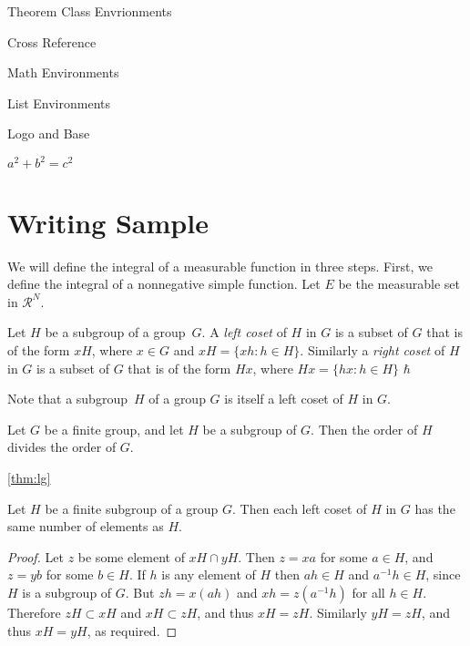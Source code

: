 \documentclass[11pt,fancy,twocol,twoside]{elegantbook}
\begin{document}
\begin{introduction}
\item Theorem Class Envrionments
\item Cross Reference
\item Math Environments
\item List Environments
\item Logo and Base 
\item $a^2+b^2=c^2$
\end{introduction}


\lipsum[1]

\section{Writing Sample}

We will define the integral of a measurable function in three steps. First, we define the integral of a nonnegative simple function. Let $E$ be the measurable set in $\mathcal{R}^N$.

\begin{definition}
Let $H$ be a subgroup of a group~$G$.  A \emph{left coset} of $H$ in $G$ is a subset of $G$ that is of the form $xH$, where $x \in G$ and $xH = \{ xh : h \in H \}$. Similarly a \emph{right coset} of $H$ in $G$ is a subset of $G$ that is of the form $Hx$, where $Hx = \{ hx : h \in H \}$ $\hbar$
\end{definition}

\begin{note}
Note that a subgroup~$H$ of a group $G$ is itself a left coset of $H$ in $G$.
\end{note}

\lipsum[2]

\begin{theorem} \label{thm:lg}
Let $G$ be a finite group, and let $H$ be a subgroup of $G$.  Then the order of $H$ divides the order of $G$.
\end{theorem}

\ref{thm:lg}
\lipsum[3]

   
\begin{proposition}
Let $H$ be a finite subgroup of a group $G$.  Then each left coset of $H$ in $G$ has the same number of elements as $H$.
\end{proposition}

\begin{proof}
Let $z$ be some element of $xH \cap yH$.  Then $z = xa$ for some $a \in H$, and $z = yb$ for some $b \in H$. If $h$ is any element of $H$ then $ah \in H$ and $a^{-1}h \in H$, since $H$ is a subgroup of $G$. But $zh = x(ah)$ and $xh = z(a^{-1}h)$ for all $h \in H$. Therefore $zH \subset xH$ and $xH \subset zH$, and thus $xH = zH$.  Similarly $yH = zH$, and thus $xH = yH$, as required. 
\end{proof}
\end{document}
